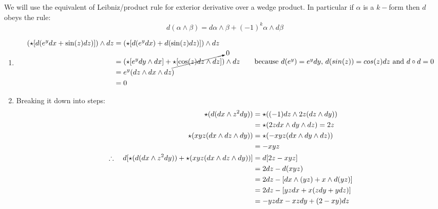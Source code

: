 \documentclass{article}
\begin{document}
\vspace{1.8cm}
\\\\

We will use the equivalent of Leibniz/product rule for exterior derivative over a wedge product.
In particular if $\alpha$ is a $k-$form then $d$ obeys the rule:\\
$$d(\alpha \wedge \beta) = d\alpha \wedge \beta + (-1)^k\alpha \wedge d\beta$$

\begin{enumerate}[label=(\alph*)]
    \item 
    \begin{align}
    (\star[d(e^y dx + \sin(z)dz)]) \wedge dz &= (\star[d(e^y dx) + d(\sin(z)dz)]) \wedge dz \notag\\
        &= (\star[e^y dy \wedge dx] + \cancelto{0}{\star[\cos(z) dz \wedge dz]}) \wedge dz \tag*{because $d(e^y) = e^ydy$, $d(sin(z)) = cos(z)dz$ and $d \circ d = 0$}\\
        &= e^y (dz \wedge dx \wedge dz) \notag\\
        &= 0 \notag
    \end{align}

    \item Breaking it down into steps:
    \begin{align}
        \star(d(dx \wedge z^2 dy)) &= \star((-1)dz \wedge 2z (dz \wedge dy)) \notag\\
            &= \star(2z dx \wedge dy \wedge dz) = 2z \notag\\
        \star(xyz(dx \wedge dz \wedge dy)) &= \star(-xyz(dx \wedge dy \wedge dz)) \notag\\
            &= -xyz \notag\\
        \therefore \quad d[\star(d(dx \wedge z^2 dy)) +\star(xyz(dx \wedge dz \wedge dy))] &= d[2z - xyz] \notag\\
            &= 2dz - d(xyz) \notag\\
            &= 2dz - [dx \wedge (yz) + x \wedge d(yz)] \notag\\
            &= 2dz - [yzdx + x(zdy + ydz)] \notag\\
            &= -yzdx - xzdy + (2-xy)dz \notag
    \end{align}
\end{enumerate}

\vspace{1.8cm}
\\\\
\end{document}

